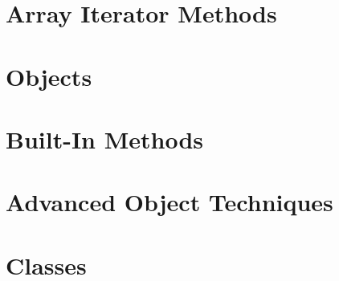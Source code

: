 \documentclass[b5paper,openany]{book}
\begin{document}
\chapter{Array Iterator Methods}


\chapter{Objects}


\chapter{Built-In Methods}


\chapter{Advanced Object Techniques}


\chapter{Classes}







\end{document}
